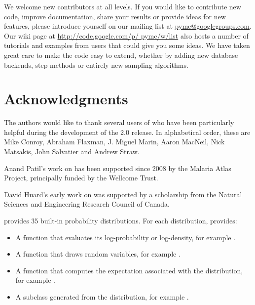 \documentclass[]{jss}
\begin{document}
We welcome new contributors at all levels. If you would like to contribute new code, improve documentation, share your results or provide ideas for new features, please introduce yourself on our mailing list at \href{pymc@googlegroups.com}{pymc@googlegroups.com}. Our wiki page at \href{http://code.google.com/p/pymc/w/list}{http://code.google.com/p/ pymc/w/list} also hosts a number of tutorials and examples from users that could give you some ideas. We have taken great care to make the code easy to extend, whether by adding new database backends, step methods or entirely new sampling algorithms.





\section[Acknowledgments]{Acknowledgments}
\label{chap:acknowledge}
The authors would like to thank several users of  who have been particularly helpful during the development of the 2.0 release. In alphabetical order, these are Mike Conroy, Abraham Flaxman, J. Miguel Marin, Aaron MacNeil, Nick Matsakis, John Salvatier and Andrew Straw.

Anand Patil's work on  has been supported since 2008 by the Malaria Atlas Project, principally funded by the Wellcome Trust.

David Huard's early work on  was supported by a scholarship from the Natural Sciences and Engineering Research Council of Canada. 
\newpage
\appendix




 provides 35 built-in probability distributions. For each distribution,  provides:
\begin{itemize}
    \item A function that evaluates its log-probability or log-density, for example .
    \item A function that draws random variables, for example .
    \item A function that computes the expectation associated with the distribution, for example .
    \item A  subclass generated from the distribution, for example .
\end{itemize}
\end{document}
